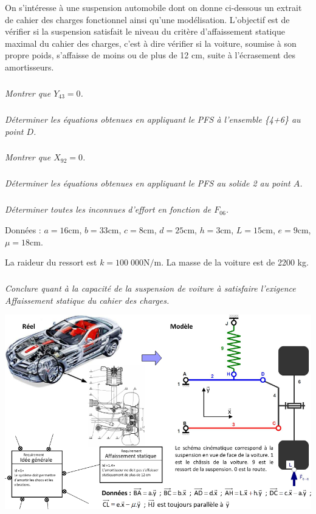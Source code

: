 \documentclass[10pt,fleqn]{article} %
\begin{document}

\vspace{7cm}
\pagestyle{fancy}
\thispagestyle{plain}


\def\columnseprulecolor{\color{ocre}}
\setlength{\columnseprule}{0.4pt} 

\begin{multicols}{2}

On s'intéresse à une suspension automobile dont on donne ci-dessous un extrait de cahier des charges fonctionnel ainsi qu’une modélisation. L'objectif est de vérifier si la suspension satisfait le niveau du critère d'affaissement statique maximal du cahier des charges, c'est à dire vérifier si la voiture, soumise à son propre poids, s'affaisse de moins ou de plus de 12 cm, suite à l'écrasement des amortisseurs. 

\subparagraph{}
\textit{Montrer que $Y_{43} =0$.}

\subparagraph{}
\textit{Déterminer les équations obtenues en appliquant le PFS à l’ensemble \{4+6\} au point $D$.}

\subparagraph{}
\textit{Montrer que $X_{92} =0$.}

\subparagraph{}
\textit{Déterminer les équations obtenues en appliquant le PFS au solide 2 au point $A$.}


\subparagraph{}
\textit{Déterminer toutes les inconnues d'effort en fonction de $F_{06}$.}

Données : $a = 16 \text{cm}$, $b = 33 \text{cm}$, $c = 8 \text{cm}$, $d = 25 \text{cm}$, $h = 3 \text{cm}$, $L = 15 \text{cm}$, $e = 9 \text{cm}$, $\mu = 18 \text{cm}$. 

La raideur du ressort est $k = 100\;000 \text{N/m}$. La masse de la voiture est de 2200 kg.

\subparagraph{}
\textit{Conclure quant à la capacité de la suspension de voiture à satisfaire l’exigence Affaissement statique du cahier des charges. }

\end{multicols}


\begin{center}
\includegraphics[width=.9\linewidth]{images/suspension}
\end{center}
\end{document}
